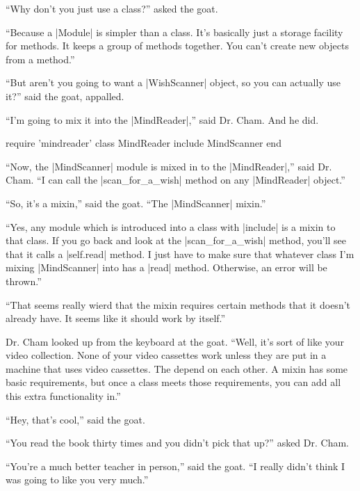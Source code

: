 \documentclass[12pt,twoside]{report}
\begin{document}
``Why don't you just use a class?'' asked the goat.

``Because a \rubyinline|Module| is simpler than a
class.  It's basically just a storage facility for methods.  It keeps
a group of methods together.  You can't create new objects from a
method.''

``But aren't you going to want a
\rubyinline|WishScanner| object, so you can actually
use it?'' said the goat, appalled.

``I'm going to mix it into the
\rubyinline|MindReader|,'' said Dr. Cham.  And he did.


\begin{rubycode}

 require 'mindreader'
 class MindReader
   include MindScanner
 end

\end{rubycode}


``Now, the \rubyinline|MindScanner| module is mixed in
to the \rubyinline|MindReader|,'' said Dr. Cham. ``I
can call the \rubyinline|scan_for_a_wish| method on
any \rubyinline|MindReader| object.''

``So, it's a mixin,'' said the goat.  ``The
\rubyinline|MindScanner| mixin.''

``Yes, any module which is introduced into a class with
\rubyinline|include| is a mixin to that class.  If you
go back and look at the \rubyinline|scan_for_a_wish|
method, you'll see that it calls a
\rubyinline|self.read| method.  I just have to make
sure that whatever class I'm mixing
\rubyinline|MindScanner| into has a
\rubyinline|read| method.  Otherwise, an error will be
thrown.''

``That seems really wierd that the mixin requires certain methods that
it doesn't already have. It seems like it should work by itself.''

Dr. Cham looked up from the keyboard at the goat.  ``Well, it's sort
of like your video collection. None of your video cassettes work
unless they are put in a machine that uses video cassettes. The depend
on each other.  A mixin has some basic requirements, but once a class
meets those requirements, you can add all this extra functionality
in.''

``Hey, that's cool,'' said the goat.

``You read the book thirty times and you didn't pick that up?'' asked
Dr. Cham.

``You're a much better teacher in person,'' said the goat.  ``I really
didn't think I was going to like you very much.''
\end{document}
